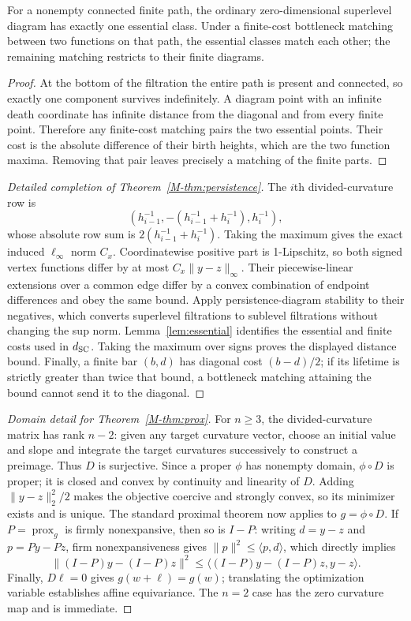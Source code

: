 \begin{lemma}
\label{lem:essential}
For a nonempty connected finite path, the ordinary zero-dimensional superlevel
diagram has exactly one essential class.  Under a finite-cost bottleneck
matching between two functions on that path, the essential classes match each
other; the remaining matching restricts to their finite diagrams.
\end{lemma}
\begin{proof}
At the bottom of the filtration the entire path is present and connected, so
exactly one component survives indefinitely.  A diagram point with an infinite
death coordinate has infinite distance from the diagonal and from every finite
point.  Therefore any finite-cost matching pairs the two essential points.
Their cost is the absolute difference of their birth heights, which are the
two function maxima.  Removing that pair leaves precisely a matching of the
finite parts.
\end{proof}

\begin{proof}[Detailed completion of Theorem~\ref{M-thm:persistence}]
The $i$th divided-curvature row is
\[
\left(h_{i-1}^{-1},
 -(h_{i-1}^{-1}+h_i^{-1}),h_i^{-1}\right),
\]
whose absolute row sum is $2(h_{i-1}^{-1}+h_i^{-1})$.  Taking the maximum gives
the exact induced $\ell_\infty$ norm $C_x$.  Coordinatewise positive part is
1-Lipschitz, so both signed vertex functions differ by at most
$C_x\|y-z\|_\infty$.  Their piecewise-linear extensions over a common edge
differ by a convex combination of endpoint differences and obey the same bound.
Apply persistence-diagram stability to their negatives, which converts
superlevel filtrations to sublevel filtrations without changing the sup norm.
Lemma~\ref{lem:essential} identifies the essential and finite costs used in
$d_{\rm SC}$.  Taking the maximum over signs proves the displayed distance
bound.  Finally,
a finite bar $(b,d)$ has diagonal cost $(b-d)/2$; if its lifetime is strictly
greater than twice that bound, a bottleneck matching attaining the bound
cannot send it to the diagonal.
\end{proof}

\begin{proof}[Domain detail for Theorem~\ref{M-thm:prox}]
For $n\ge3$, the divided-curvature matrix has rank $n-2$: given any target
curvature vector, choose an initial value and slope and integrate the target
curvatures successively to construct a preimage.  Thus $D$ is surjective.
Since a proper $\phi$ has nonempty domain, $\phi\circ D$ is proper; it is closed
and convex by continuity and linearity of $D$.  Adding
$\|y-z\|_2^2/2$ makes the objective coercive and strongly convex, so its
minimizer exists and is unique.  The standard proximal theorem now applies to
$g=\phi\circ D$.  If $P=\operatorname{prox}_g$ is firmly nonexpansive, then so
is $I-P$: writing $d=y-z$ and $p=Py-Pz$, firm nonexpansiveness gives
$\|p\|^2\le\langle p,d\rangle$, which directly implies
\[
\|(I-P)y-(I-P)z\|^2\le
\langle (I-P)y-(I-P)z,y-z\rangle.
\]
Finally, $D\ell=0$ gives
$g(w+\ell)=g(w)$; translating the optimization variable establishes affine
equivariance.  The $n=2$ case has the zero curvature map and is immediate.
\end{proof}

